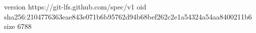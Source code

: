 version https://git-lfs.github.com/spec/v1
oid sha256:2104776363eae843e071b6b95762d94b68bef262c2e1a54324a54aa8400211b6
size 6788
